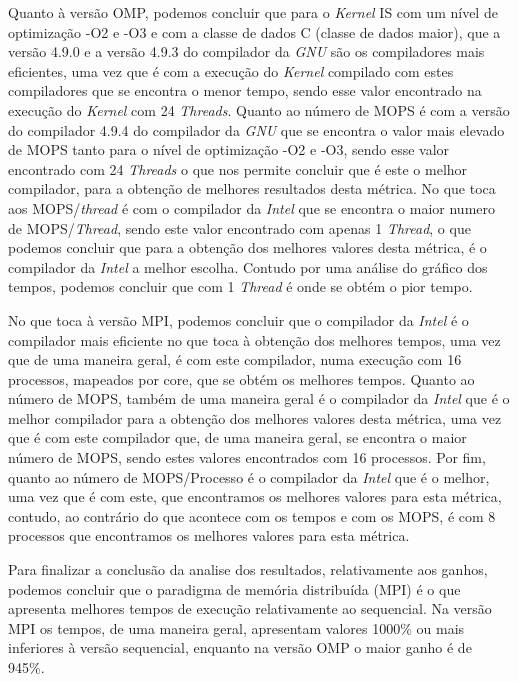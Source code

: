 \documentclass[conference,compsoc]{IEEEtran}
\begin{document}
Quanto à versão OMP, podemos concluir que para o \textit{Kernel} IS com um nível de optimização -O2 e -O3 e com a classe de dados C (classe de dados maior), que a versão 4.9.0 e a versão 4.9.3 do compilador da \textit{GNU} são os compiladores mais eficientes, uma vez que é com a execução do \textit{Kernel} compilado com estes compiladores que se encontra o menor tempo, sendo esse valor encontrado na execução do \textit{Kernel} com 24 \textit{Threads}. Quanto ao número de MOPS é com a versão do compilador 4.9.4 do compilador da \textit{GNU} que se encontra o valor mais elevado de MOPS tanto para o nível de optimização -O2 e -O3, sendo esse valor encontrado com 24 \textit{Threads} o que nos permite concluir que é este o melhor compilador, para a obtenção de melhores resultados desta métrica. No que toca aos MOPS/\textit{thread} é com o compilador da \textit{Intel} que se encontra o maior numero de MOPS/\textit{Thread}, sendo este valor encontrado com apenas 1 \textit{Thread}, o que podemos concluir que para a obtenção dos melhores valores desta métrica, é o compilador da \textit{Intel} a melhor escolha. Contudo por uma análise do gráfico dos tempos, podemos concluir que com 1 \textit{Thread} é onde se obtém o pior tempo.

No que toca à versão MPI, podemos concluir que o compilador da \textit{Intel} é o compilador mais eficiente no que toca à obtenção dos melhores tempos, uma vez que de uma maneira geral, é com este compilador, numa execução com 16 processos, mapeados por core, que se obtém os melhores tempos. Quanto ao número de MOPS, também de uma maneira geral é o compilador da \textit{Intel} que é o melhor compilador para a obtenção dos melhores valores desta métrica, uma vez que é com este compilador que, de uma maneira geral, se encontra o maior número de MOPS, sendo estes valores encontrados com 16 processos. Por fim, quanto ao número de MOPS/Processo é o compilador da \textit{Intel} que é o melhor, uma vez que é com este, que encontramos os melhores valores para esta métrica, contudo, ao contrário do que acontece com os tempos e com os MOPS, é com 8 processos que encontramos os melhores valores para esta métrica.

Para finalizar a conclusão da analise dos resultados, relativamente aos ganhos, podemos concluir que o paradigma de memória distribuída (MPI) é o que apresenta melhores tempos de execução relativamente ao sequencial. Na versão MPI os tempos, de uma maneira geral, apresentam valores 1000\% ou mais inferiores à versão sequencial, enquanto na versão OMP o maior ganho é de 945\%.
\end{document}
